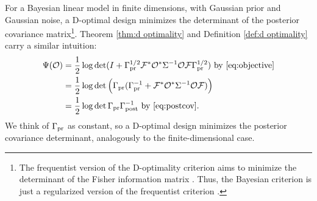 For a Bayesian linear model in finite dimensions, with Gaussian prior
and Gaussian noise, a D-optimal design minimizes the determinant of
the posterior covariance matrix\footnote{The frequentist version of
the D-optimality criterion aims to minimize the determinant of the
Fisher information matrix \cite[page 16]{Ucinski05}. Thus, the
Bayesian criterion is just a regularized version of the frequentist
criterion \cite{Chaloner1995}.}. Theorem \ref{thm:d optimality} and
Definition \ref{def:d optimality} carry a similar intuition:
\begin{align*}
  \begin{split}
    \tar(\obs) &= \frac12 \log \det ( I + \prcov^{1/2}  \fwd ^* \obs^* \Sigma^{-1} \obs \fwd \prcov^{1/2}) \text{ by \eqref{eq:objective}}\\
    &= \frac12 \log \det \Big( \prcov ( \prcov^{-1} + \fwd ^* \obs^* \Sigma^{-1} \obs \fwd) \Big )\\
    &= \frac12 \log \det \prcov \postcov^{-1} \text{ by \eqref{eq:postcov}}.
  \end{split}
\end{align*}
We think of $\Gamma_{\textup{pr}}$ as constant, so a D-optimal design minimizes the
posterior covariance determinant, analogously to the
finite-dimensional case.



